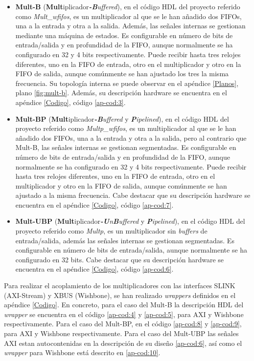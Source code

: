\begin{itemize}
    \item \textbf{Mult-B} (\textbf{Mult}iplicador\textit{\textbf{-B}uffered}), en el código HDL del proyecto referido como \textit{Mult\_wfifos}, es un multiplicador al que se le han añadido dos FIFOs, una a la entrada y otra a la salida.
Además, las señales internas se gestionan mediante una máquina de estados. 
Es configurable en número de bits de entrada/salida y en profundidad de la FIFO, aunque normalmente se ha configurado en 32 y 4 bits respectivamente.
Puede recibir hasta tres relojes diferentes, uno en la FIFO de entrada, otro en el multiplicador y otro en la FIFO de salida, aunque comúnmente se han ajustado los tres la misma frecuencia.
Su topología interna se puede observar en el apéndice \ref{Planos}, plano \ref{fig:mult-b}.
Además, su descripción hardware se encuentra en el apéndice \ref{Codigo}, código \ref{ap-cod:3}.
\item \textbf{Mult-BP} (\textbf{Mult}iplicador\textit{\textbf{-B}uffered} y \textit{\textbf{P}ipelined}), en el código HDL del proyecto referido como \textit{Multp\_wfifos}, es un multiplicador al que se le han añadido dos FIFOs, una a la entrada y otra a la salida, pero al contrario que Mult-B, las señales internas se gestionan segmentadas.
Es configurable en número de bits de entrada/salida y en profundidad de la FIFO, aunque normalmente se ha configurado en 32 y 4 bits respectivamente.
Puede recibir hasta tres relojes diferentes, uno en la FIFO de entrada, otro en el multiplicador y otro en la FIFO de salida, aunque comúnmente se han ajustado a la misma frecuencia.
Cabe destacar que su descripción hardware se encuentra en el apéndice \ref{Codigo}, código \ref{ap-cod:7}.
\item \textbf{Mult-UBP} (\textbf{Mult}iplicador\textit{\textbf{-U}n\textbf{B}uffered} y \textit{\textbf{P}ipelined}), en el código HDL del proyecto referido como \textit{Multp}, es un multiplicador sin \textit{buffers} de entrada/salida, además las señales internas se gestionan segmentadas.
Es configurable en número de bits de entrada/salida, aunque normalmente se ha configurado en 32 bits.
Cabe destacar que su descripción hardware se encuentra en el apéndice \ref{Codigo}, código \ref{ap-cod:6}.
\end{itemize}

Para realizar el acoplamiento de los multiplicadores con las interfaces SLINK (AXI-Stream) y XBUS (Wishbone), se han realizado \textit{wrappers} definidos en el apéndice \ref{Codigo}.
En concreto, para el caso del Mult-B la descripción HDL del \textit{wrapper} se encuentra en el código \ref{ap-cod:4} y \ref{ap-cod:5}, para AXI y Wishbone respectivamente.
Para el caso del Mult-BP, en el código \ref{ap-cod:8} y \ref{ap-cod:9}, para AXI y Wishbone respectivamente.
Para el caso del Mult-UBP las señales AXI estan autocontenidas en la descripción de su diseño \ref{ap-cod:6}, así como el \textit{wrapper} para Wishbone está descrito en \ref{ap-cod:10}.

